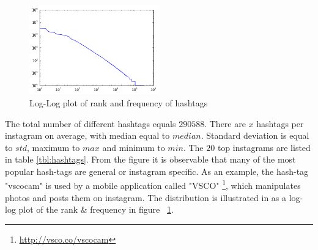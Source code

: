 \begin{figure}[h!]
  \centering
    \includegraphics[width=0.5\textwidth]{images/hashtag-log-log}
  \caption{Log-Log plot of rank and frequency of hashtags}
  \label{fig:hashtag_log_log}
\end{figure}

The total number of different hashtags equals $290588$. There are $x$ hashtags per instagram on average, with median equal to $median$. Standard deviation is equal to $std$, maximum to $max$ and minimum to $min$. The $20$ top instagrams are listed in table \ref{tbl:hashtags}. From the figure it is observable that many of the most popular hash-tags are general or instagram specific. As an example, the hash-tag "vscocam" is used by a mobile application called "VSCO" \footnote{\url{http://vsco.co/vscocam}}, which manipulates photos and posts them on instagram. The distribution is illustrated in as a log-log plot of the rank \& frequency in figure ~\ref{fig:hashtag_log_log}.

